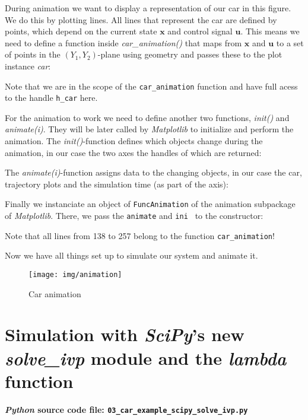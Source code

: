 \documentclass[a4paper,11pt,headings=standardclasses,parskip=half]{scrartcl}
\newcommand{\listcode}[3]{}
\newcommand{\listcodeanim}[2]{\listcode{#1}{#2}{../sim/02_car_example_animation.py}}
\newcommand{\py}{\emph{Python}\xspace}
\newcommand{\scipy}{\emph{SciPy}\xspace}
\newcommand{\mpl}{\emph{Matplotlib}\xspace}
\newcommand{\uu}{\mathbf{u}}
\newcommand{\x}{\mathbf{x}}
\begin{document}
During animation we want to display a representation of our car in this figure. We do this by plotting lines. All lines that represent the car are defined by points, which depend on the current state $\x$ and control signal $\uu$. This means we need to define a function inside \emph{car\_animation()} that maps from $\x$ and $\uu$ to a set of points in the $(Y_1,Y_2)$-plane using geometry and passes these to the plot instance \emph{car}:
\listcodeanim{167}{226}
Note that we are in the scope of the \texttt{car\_animation} function and have full acess to the handle \texttt{h\_car} here.

For the animation to work we need to define another two functions, \emph{init()} and \emph{animate(i)}. They will be later called by \mpl to initialize and perform the animation. The \emph{init()}-function defines which objects change during the animation, in our case the two axes the handles of which are returned:
\listcodeanim{225}{234}

The \emph{animate(i)}-function assigns data to the changing objects, in our case the car, trajectory plots and the simulation time (as part of the axis):
\listcodeanim{236}{250}

Finally we instanciate an object of \texttt{FuncAnimation} of the animation subpackage of \mpl. There, we pass the \texttt{animate} and \texttt{ini } to the constructor:
\listcodeanim{252}{258}

Note that all lines from 138 to 257 belong to the function \texttt{car\_animation}!

Now we have all things set up to simulate our system and animate it.
\listcodeanim{274}{277}

\begin{figure}[ht]
  \centering
  \texttt{[image: img/animation]}
  \caption{Car animation}
  \label{fig:animation}
\end{figure}
        



\section{Simulation with \scipy's new \emph{solve\_ivp} module and the \emph{lambda} function}\label{sec:ScipyLambda}

\textbf{\py source code file: \texttt{03\_car\_example\_scipy\_solve\_ivp.py}}
\end{document}
